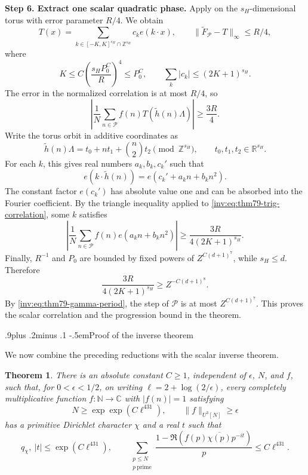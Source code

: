 \documentclass[twoside]{aomart}
\makeatletter
\theoremstyle{paperplain}
\newtheorem{theorem}{Theorem}[section]
\theoremstyle{paperdefinition}
\renewcommand\subsection{\@startsection{subsection}{2}{\z@}
  {.9\baselineskip plus .2\baselineskip minus .1\baselineskip}
  {-.5em}{\normalfont\bfseries}}
\renewenvironment{proof}[1][\proofname]{\par\pushQED{\qed}%
  \normalfont\topsep6\p@\@plus3\p@\relax\trivlist
  \item[\hskip\labelsep\itshape #1\@addpunct{.}]\ignorespaces
}{\popQED\endtrivlist\@endpefalse}
\numberwithin{equation}{section}
\makeatother
\begin{document}
\begin{proof}
\par
\medskip
\noindent\textbf{Step 6. Extract one scalar quadratic phase.}
Apply  on the $s_H$-dimensional torus with error
parameter $R/4$.  We obtain
\[
 T(x)=\sum_{k\in[-K,K]^{s_H}\cap\mathbb Z^{s_H}}c_k e(k\cdot x),
 \qquad \|\widetilde F_{\mathcal P}-T\|_\infty\le R/4,
\]
where
\begin{equation*}
 K\le C\left(\frac{s_HP_0^C}{R}\right)^4\le P_0^C,
 \qquad
 \sum_k|c_k|\le(2K+1)^{s_H}.
\end{equation*}
The error in the normalized correlation is at most $R/4$, so
\begin{equation}
 \left|\frac1N\sum_{n\in\mathcal P}f(n)T(\widetilde h(n)\Lambda)\right|
 \ge\frac{3R}{4}.
 \label{inv:eq:thm79-trig-correlation}
\end{equation}
Write the torus orbit in additive coordinates as
\[
 \widetilde h(n)\Lambda=t_0+n t_1+\binom n2t_2
 \pmod{\mathbb Z^{s_H}},
 \qquad t_0,t_1,t_2\in\mathbb R^{s_H}.
\]
For each $k$, this gives real numbers $a_k,b_k,c_k'$ such that
\[
 e(k\cdot\widetilde h(n))=e(c_k'+a_kn+b_kn^2).
\]
The constant factor $e(c_k')$ has absolute value one and can be absorbed
into the Fourier coefficient.  By the triangle inequality applied to
\eqref{inv:eq:thm79-trig-correlation}, some $k$ satisfies
\begin{equation*}
 \left|\frac1N\sum_{n\in\mathcal P}f(n)e(a_kn+b_kn^2)\right|
 \ge\frac{3R}{4(2K+1)^{s_H}}.
\end{equation*}
Finally, $R^{-1}$ and $P_0$ are bounded by fixed powers of
$Z^{C(d+1)^7}$, while $s_H\le d$.  Therefore
\[
 \frac{3R}{4(2K+1)^{s_H}}
 \ge Z^{-C(d+1)^8}.
\]
By \eqref{inv:eq:thm79-gamma-period}, the step of $\mathcal P$ is at most
$Z^{C(d+1)^7}$.  This proves the scalar correlation and the progression
bound in the theorem.
\end{proof}

\subsection{Proof of the inverse theorem}

We now combine the preceding reductions with the scalar inverse theorem.

\begin{theorem}
\label{thm:mult_inverse}
There is an absolute constant $C\ge1$, independent of $\epsilon$, $N$, and $f$,
such that, for $0<\epsilon<1/2$, on writing
$\ell=2+\log(2/\epsilon)$, every completely multiplicative
function $f:\mathbb N\to\mathbb C$ with $|f(n)|=1$ satisfying
\begin{equation*}
 N\ge\exp\exp(C\ell^{431}),\qquad
 \|f\|_{U^3[N]}\ge\epsilon
\end{equation*}
has a primitive Dirichlet character $\chi$ and a real $t$
such that
\begin{equation}
 q_\chi,\ |t|\le\exp(C\ell^{431}),\qquad
 \sum_{\substack{p\le N\\p\ \mathrm{prime}}}\frac{1-\Re(f(p)\overline{\chi(p)}p^{-it})}{p}
       \le C\ell^{431}.
 \label{inv:eq:numerical-inverse-output}
\end{equation}
\end{theorem}
\end{document}
